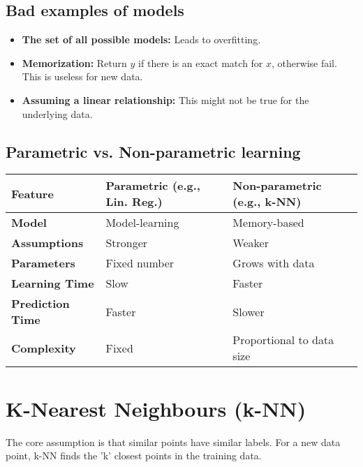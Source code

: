 \documentclass{article}
\begin{document}
\begin{multicols}{2}
	\subsection{Bad examples of models}
	\begin{itemize}
		\item \textbf{The set of all possible models:} Leads to overfitting.
		\item \textbf{Memorization:} Return $y$ if there is an exact match for $x$, otherwise fail. This is useless for new data.
		\item \textbf{Assuming a linear relationship:} This might not be true for the underlying data.
	\end{itemize}

	\subsection{Parametric vs. Non-parametric learning}
	\begin{table}[h!]
		\centering
		\begin{tabular}{|l|l|l|}
			\hline
			\textbf{Feature}         & \textbf{Parametric (e.g., Lin. Reg.)} & \textbf{Non-parametric (e.g., k-NN)} \\
			\hline
			\textbf{Model}           & Model-learning                        & Memory-based                         \\
			\textbf{Assumptions}     & Stronger                              & Weaker                               \\
			\textbf{Parameters}      & Fixed number                          & Grows with data                      \\
			\textbf{Learning Time}   & Slow                                  & Faster                               \\
			\textbf{Prediction Time} & Faster                                & Slower                               \\
			\textbf{Complexity}      & Fixed                                 & Proportional to data size            \\
			\hline
		\end{tabular}
	\end{table}

	\section{K-Nearest Neighbours (k-NN)}
	The core assumption is that similar points have similar labels.  For a new data point, k-NN finds the 'k' closest points in the training data.


\end{multicols}
\end{document}
